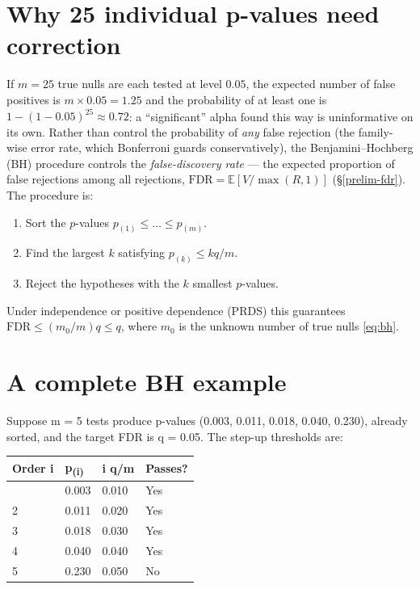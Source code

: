 \hypertarget{why-25-individual-p-values-need-correction}{%
\section{Why 25 individual p-values need
correction}\label{why-25-individual-p-values-need-correction}}

If $m=25$ true nulls are each tested at level $0.05$, the expected number
of false positives is $m\times0.05=1.25$ and the probability of at least
one is $1-(1-0.05)^{25}\approx0.72$: a ``significant'' alpha found this way
is uninformative on its own. Rather than control the probability of
\emph{any} false rejection (the family-wise error rate, which Bonferroni
guards conservatively), the Benjamini--Hochberg (BH) procedure controls the
\emph{false-discovery rate} --- the expected proportion of false rejections
among all rejections,
$\mathrm{FDR}=\mathbb{E}[V/\max(R,1)]$ (\S\ref{prelim-fdr}). The procedure
is:
\begin{enumerate}
\tightlist
\item
  Sort the $p$-values $p_{(1)}\le\dots\le p_{(m)}$.
\item
  Find the largest $k$ satisfying $p_{(k)}\le kq/m$.
\item
  Reject the hypotheses with the $k$ smallest $p$-values.
\end{enumerate}
Under independence or positive dependence (PRDS) this guarantees
$\mathrm{FDR}\le(m_0/m)q\le q$, where $m_0$ is the unknown number of true
nulls \eqref{eq:bh}.

\hypertarget{a-complete-bh-example}{%
\section{A complete BH example}\label{a-complete-bh-example}}

Suppose m = 5 tests produce p-values (0.003, 0.011, 0.018, 0.040,
0.230), already sorted, and the target FDR is q = 0.05. The step-up
thresholds are:

\begin{longtable}[]{@{}p{}p{}p{}p{}@{}}
\toprule\noalign{}
Order i & p\textsubscript{(i)} & i q/m & Passes? \\
\midrule\noalign{}
\endhead
\bottomrule\noalign{}
\endlastfoot
1 & 0.003 & 0.010 & Yes \\
2 & 0.011 & 0.020 & Yes \\
3 & 0.018 & 0.030 & Yes \\
4 & 0.040 & 0.040 & Yes \\
5 & 0.230 & 0.050 & No \\
\end{longtable}

